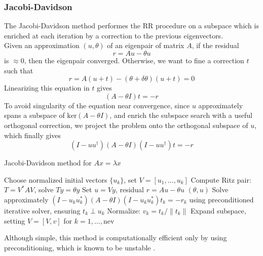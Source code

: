 \subsubsection{Jacobi-Davidson}
The Jacobi-Davidson method \cite{JacobiDavidson} performes the RR procedure on a subspace which is enriched at each iteration by a correction to the previous eigenvectors.
\\Given an approximation $(u, \theta)$ of an eigenpair of matrix $A$, if the residual
\begin{equation}
    \label{eq:residual}
    r= A u - \theta u
\end{equation}
is $\approx 0$, then the eigenpair converged. Otherwise, we want to fine a correction $t$ such that 
\begin{equation}
    \label{eq:jacobi_correction}
    r= A(u+t) - (\theta + \delta \theta) (u+t) = 0 
\end{equation}
Linearizing this equation in $t$ gives
\begin{equation}
   (A - \theta  I ) t = -r 
\end{equation}
To avoid singularity of the equation near convergence, since $u$ approximately spans a subspace of $\text{ker} (A-\theta I)$, and enrich the subspace search with a useful orthogonal correction, we project the problem onto the orthogonal subspace of $u$, which finally gives
\begin{equation}
    \label{eq:jacobi_eq_proj}
    ( I - uu^\dagger) (A - \theta  I )(I - u u^\dagger) t = -r
\end{equation}
\begin{algorithm}[H]
\caption{Jacobi-Davidson method for $A x = \lambda x$}
\begin{algorithmic}[1]
\STATE Choose normalized initial vectors $\{u_k\}$, set $V = [u_1, \ldots, u_{k}]$
\REPEAT
    \STATE Compute Ritz pair: $T = V^* A V$, solve $T y = \theta y$
    \STATE Set $u = V y$, residual $r = A u - \theta u$
         \RETURN $(\theta, u)$
    \ENDIF
    \STATE Solve approximately $(I - u_k u_k^*)(A - \theta I)(I - u_k u_k^*) t_k = -r_k$
        using preconditioned iterative solver, ensuring $t_k \perp u_k$
    \STATE Normalize: $v_k = t_k / \|t_k\|$
    \STATE Expand subspace, setting $V = [V, v]$
for $k = 1, \dots, \text{nev}$
\end{algorithmic}
\end{algorithm}
Although simple, this method is computationally efficient only by using preconditioning, which is known to be unstable \cite{Saad1992}.
